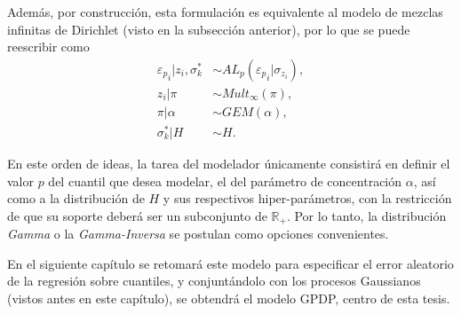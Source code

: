 Adem\'as, por construcci\'on, esta formulaci\'on es equivalente al modelo de mezclas infinitas de Dirichlet (visto en la subsecci\'on anterior), por lo que se puede reescribir como
\begin{equation*}
\begin{aligned}
   {\varepsilon_p}_i | z_i, \sigma_k^* &\sim AL_p({\varepsilon_p}_i | \sigma_{z_i}), \\
   z_i | \pi &\sim Mult_\infty(\pi), \\
   \pi | \alpha &\sim GEM(\alpha), \\
   \sigma_k^* | H &\sim H.
\end{aligned}
\end{equation*}

En este orden de ideas, la tarea del modelador \'unicamente consistir\'a en definir el valor $p$ del cuantil que desea modelar, el del par\'ametro de concentraci\'on $\alpha$, as\'i como a la distribuci\'on de $H$ y sus respectivos hiper-par\'ametros, con la restricci\'on de que su soporte deber\'a ser un subconjunto de $\mathbb{R}_+$. Por lo tanto, la distribuci\'on \textit{Gamma} o la \textit{Gamma-Inversa} se postulan como opciones convenientes.

En el siguiente cap\'itulo se retomar\'a este modelo para especificar el error aleatorio de la regresi\'on sobre cuantiles, y conjunt\'andolo con los procesos Gaussianos (vistos antes en este cap\'itulo), se obtendr\'a el modelo GPDP, centro de esta tesis.

\newpage